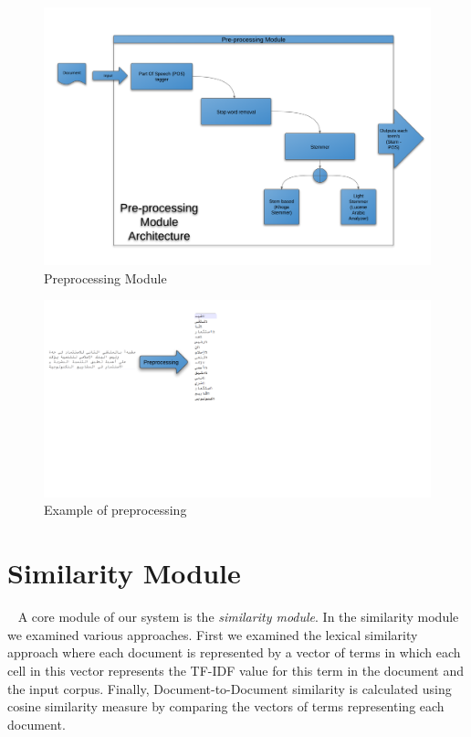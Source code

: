 \begin{figure}[htb]
\begin{center}
\includegraphics[totalheight=1\textheight,
width=1\textwidth]{./Figures/arch_2.png}
\end{center}
\caption{Preprocessing Module}
\label{fig:arch_1}
\end{figure}


\begin{figure}[htb]
\begin{center}
\includegraphics[totalheight=.75\textheight,
width=.75\textwidth]{./Figures/arch_3.png}
\end{center}
\caption{Example of preprocessing}
\label{fig:arch_3}
\end{figure}

\section{Similarity Module}~\label{sec:similarity}
A core module of our system is the \textit{similarity module}. In the similarity module we examined various approaches. First we examined the lexical similarity approach where each document is represented by a vector of terms in which each cell in this vector represents the TF-IDF value for this term in the document and the input corpus. 
Finally, Document-to-Document similarity is calculated using cosine similarity measure by comparing the vectors of terms representing each document.

